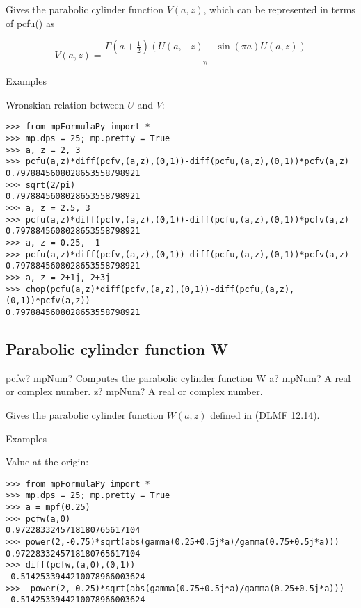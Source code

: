 \vpara
Gives the parabolic cylinder function $V(a, z)$, which can be represented in terms of pcfu() as

\begin{equation}
V(a, z) = \frac{\Gamma(a+\frac{1}{2}) (U(a, -z) - \sin(\pi a)U(a, z))}{\pi}
\end{equation}

Examples

Wronskian relation between $U$ and $V$:

\begin{lstlisting}
>>> from mpFormulaPy import *
>>> mp.dps = 25; mp.pretty = True
>>> a, z = 2, 3
>>> pcfu(a,z)*diff(pcfv,(a,z),(0,1))-diff(pcfu,(a,z),(0,1))*pcfv(a,z)
0.7978845608028653558798921
>>> sqrt(2/pi)
0.7978845608028653558798921
>>> a, z = 2.5, 3
>>> pcfu(a,z)*diff(pcfv,(a,z),(0,1))-diff(pcfu,(a,z),(0,1))*pcfv(a,z)
0.7978845608028653558798921
>>> a, z = 0.25, -1
>>> pcfu(a,z)*diff(pcfv,(a,z),(0,1))-diff(pcfu,(a,z),(0,1))*pcfv(a,z)
0.7978845608028653558798921
>>> a, z = 2+1j, 2+3j
>>> chop(pcfu(a,z)*diff(pcfv,(a,z),(0,1))-diff(pcfu,(a,z),(0,1))*pcfv(a,z))
0.7978845608028653558798921
\end{lstlisting}



\subsection{Parabolic cylinder function W}

\begin{mpFunctionsExtract}
	\mpFunctionTwo
	{pcfw? mpNum? Computes the parabolic cylinder function W}
	{a? mpNum? A real or complex number.}
	{z? mpNum? A real or complex number.}	
\end{mpFunctionsExtract}


Gives the parabolic cylinder function $W(a, z)$ defined in (DLMF 12.14).

Examples

Value at the origin:

\begin{lstlisting}
>>> from mpFormulaPy import *
>>> mp.dps = 25; mp.pretty = True
>>> a = mpf(0.25)
>>> pcfw(a,0)
0.9722833245718180765617104
>>> power(2,-0.75)*sqrt(abs(gamma(0.25+0.5j*a)/gamma(0.75+0.5j*a)))
0.9722833245718180765617104
>>> diff(pcfw,(a,0),(0,1))
-0.5142533944210078966003624
>>> -power(2,-0.25)*sqrt(abs(gamma(0.75+0.5j*a)/gamma(0.25+0.5j*a)))
-0.5142533944210078966003624
\end{lstlisting}





